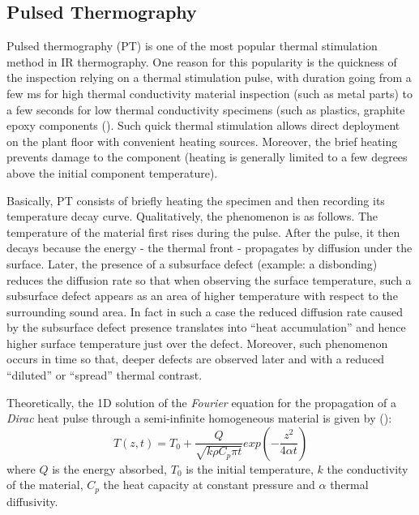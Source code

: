 \subsection{Pulsed Thermography}

Pulsed thermography (PT) is one of the most popular thermal stimulation method in IR thermography. One reason for this popularity is the quickness of the inspection relying on a thermal stimulation pulse, with duration going from a few ms for high thermal conductivity material inspection (such as metal parts) to a few seconds for low thermal conductivity specimens (such as plastics, graphite epoxy components (\citet{Maldague1993Nondestructive,Maldague1994bInfra}). Such quick thermal stimulation allows direct deployment on the plant floor with convenient heating sources. Moreover, the brief heating prevents damage to the component (heating is generally limited to a few degrees above the initial component temperature).

Basically, PT consists of briefly heating the specimen and then recording its temperature decay curve. Qualitatively, the phenomenon is as follows. The temperature of the material first rises during the pulse. After the pulse, it then decays because the energy - the thermal front - propagates by diffusion under the surface. Later, the presence of a subsurface defect (example: a disbonding) reduces the diffusion rate so that when observing the surface temperature, such a subsurface defect appears as an area of higher temperature with respect to the surrounding sound area. In fact in such a case the reduced diffusion rate caused by the subsurface defect presence translates into “heat accumulation” and hence higher surface temperature just over the defect. Moreover, such phenomenon occurs in time so that, deeper defects are observed later and with a reduced “diluted” or “spread” thermal contrast.

Theoretically, the 1D solution of the \textit{Fourier} equation for the propagation of a \textit{Dirac} heat pulse through a semi-infinite homogeneous material is given by (\citet{carslaw1986heat}):
\begin{equation}
T(z,t) = T_0 + \frac{Q}{\sqrt{k\rho C_p \pi t}}exp(-\frac{z^2}{4\alpha t})
\end{equation}
where $Q$ is the energy absorbed, $T_0$  is the initial temperature, $k$ the conductivity of the material, $C_p$ the heat capacity at constant pressure and $\alpha$ thermal diffusivity.

